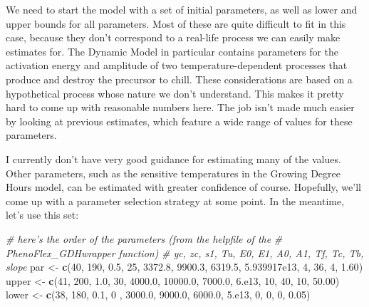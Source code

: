 \documentclass[
]{book}
\newenvironment{Shaded}{\begin{snugshade}}{\end{snugshade}}
\newcommand{\CommentTok}[1]{\textcolor[rgb]{0.56,0.35,0.01}{\textit{#1}}}
\newcommand{\DecValTok}[1]{\textcolor[rgb]{0.00,0.00,0.81}{#1}}
\newcommand{\FloatTok}[1]{\textcolor[rgb]{0.00,0.00,0.81}{#1}}
\newcommand{\KeywordTok}[1]{\textcolor[rgb]{0.13,0.29,0.53}{\textbf{#1}}}
\newcommand{\NormalTok}[1]{#1}
\newcommand{\StringTok}[1]{\textcolor[rgb]{0.31,0.60,0.02}{#1}}
\begin{document}
We need to start the model with a set of initial parameters, as well as lower and upper bounds for all parameters. Most of these are quite difficult to fit in this case, because they don't correspond to a real-life process we can easily make estimates for. The Dynamic Model in particular contains parameters for the activation energy and amplitude of two temperature-dependent processes that produce and destroy the precursor to chill. These considerations are based on a hypothetical process whose nature we don't understand. This makes it pretty hard to come up with reasonable numbers here. The job isn't made much easier by looking at previous estimates, which feature a wide range of values for these parameters.

I currently don't have very good guidance for estimating many of the values. Other parameters, such as the sensitive temperatures in the Growing Degree Hours model, can be estimated with greater confidence of course. Hopefully, we'll come up with a parameter selection strategy at some point. In the meantime, let's use this set:

\begin{Shaded}
\begin{Highlighting}[]
\CommentTok{# here's the order of the parameters (from the helpfile of the}
\CommentTok{# PhenoFlex_GDHwrapper function)}
\CommentTok{#          yc,  zc,  s1, Tu,    E0,      E1,     A0,         A1,   Tf, Tc, Tb,  slope}
\NormalTok{par <-}\StringTok{   }\KeywordTok{c}\NormalTok{(}\DecValTok{40}\NormalTok{, }\DecValTok{190}\NormalTok{, }\FloatTok{0.5}\NormalTok{, }\DecValTok{25}\NormalTok{, }\FloatTok{3372.8}\NormalTok{,  }\FloatTok{9900.3}\NormalTok{, }\FloatTok{6319.5}\NormalTok{, }\FloatTok{5.939917e13}\NormalTok{,  }\DecValTok{4}\NormalTok{, }\DecValTok{36}\NormalTok{,  }\DecValTok{4}\NormalTok{,  }\FloatTok{1.60}\NormalTok{)}
\NormalTok{upper <-}\StringTok{ }\KeywordTok{c}\NormalTok{(}\DecValTok{41}\NormalTok{, }\DecValTok{200}\NormalTok{, }\FloatTok{1.0}\NormalTok{, }\DecValTok{30}\NormalTok{, }\FloatTok{4000.0}\NormalTok{, }\FloatTok{10000.0}\NormalTok{, }\FloatTok{7000.0}\NormalTok{,       }\DecValTok{6}\NormalTok{.e13, }\DecValTok{10}\NormalTok{, }\DecValTok{40}\NormalTok{, }\DecValTok{10}\NormalTok{, }\FloatTok{50.00}\NormalTok{)}
\NormalTok{lower <-}\StringTok{ }\KeywordTok{c}\NormalTok{(}\DecValTok{38}\NormalTok{, }\DecValTok{180}\NormalTok{, }\FloatTok{0.1}\NormalTok{, }\DecValTok{0}\NormalTok{ , }\FloatTok{3000.0}\NormalTok{,  }\FloatTok{9000.0}\NormalTok{, }\FloatTok{6000.0}\NormalTok{,       }\DecValTok{5}\NormalTok{.e13,  }\DecValTok{0}\NormalTok{,  }\DecValTok{0}\NormalTok{,  }\DecValTok{0}\NormalTok{,  }\FloatTok{0.05}\NormalTok{)}
\end{Highlighting}
\end{Shaded}
\end{document}
